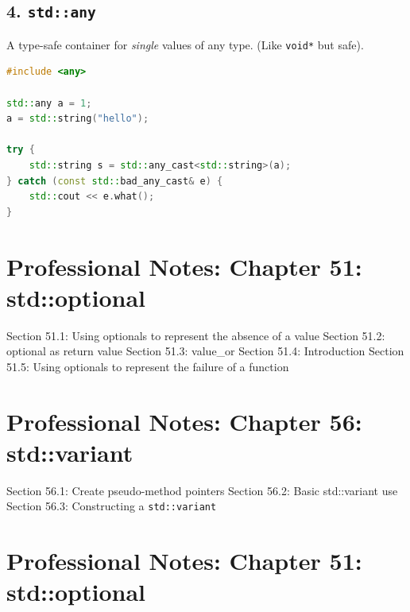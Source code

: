 \hypertarget{stdany}{%
\section{\texorpdfstring{4.
\texttt{std::any}}{4. std::any}}\label{stdany}}

A type-safe container for \emph{single} values of any type. (Like
\passthrough{\lstinline!void*!} but safe).

\begin{lstlisting}[language={C++}]
#include <any>

std::any a = 1;
a = std::string("hello");

try {
    std::string s = std::any_cast<std::string>(a);
} catch (const std::bad_any_cast& e) {
    std::cout << e.what();
}
\end{lstlisting}

\hypertarget{professional-notes-chapter-51-stdoptional}{%
\chapter{Professional Notes: Chapter 51:
std::optional}\label{professional-notes-chapter-51-stdoptional}}

Section 51.1: Using optionals to represent the absence of a value
Section 51.2: optional as return value Section 51.3: value\_or Section
51.4: Introduction Section 51.5: Using optionals to represent the
failure of a function

\hypertarget{professional-notes-chapter-56-stdvariant}{%
\chapter{Professional Notes: Chapter 56:
std::variant}\label{professional-notes-chapter-56-stdvariant}}

Section 56.1: Create pseudo-method pointers Section 56.2: Basic
std::variant use Section 56.3: Constructing a
\passthrough{\lstinline!std::variant!}

\hypertarget{professional-notes-chapter-51-stdoptional-1}{%
\chapter{Professional Notes: Chapter 51:
std::optional}\label{professional-notes-chapter-51-stdoptional-1}}

